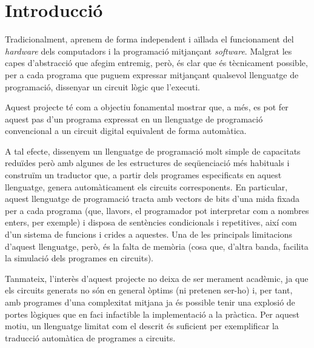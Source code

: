 
\section{Introducció}

Tradicionalment, aprenem de forma independent i aïllada el funcionament del 
\textit{hardware} dels computadors i la programació mitjançant 
\textit{software}. Malgrat les capes d'abstracció que afegim entremig, però, 
és clar que és tècnicament possible, per a cada programa que puguem expressar 
mitjançant qualsevol llenguatge de programació, dissenyar un circuit lògic que 
l'executi.

Aquest projecte té com a objectiu fonamental mostrar que, a més, es pot fer 
aquest pas d'un programa expressat en un llenguatge de programació 
convencional a un circuit digital equivalent de forma automàtica. 

A tal efecte, dissenyem un llenguatge de programació molt simple de capacitats 
reduïdes però amb algunes de les estructures de seqüenciació més habituals i 
construïm un traductor que, a partir dels programes especificats en aquest 
llenguatge, genera automàticament els circuits corresponents. En particular, 
aquest llenguatge de programació tracta amb vectors de bits d'una mida 
fixada per a cada programa (que, llavors, el programador pot interpretar com a 
nombres enters, per exemple) i disposa de sentències condicionals i 
repetitives, així com d'un sistema de funcions i crides a aquestes. Una de 
les principals limitacions d'aquest llenguatge, però, és la falta de memòria 
(cosa que, d'altra banda, facilita la simulació dels programes en circuits). 

Tanmateix, l'interès d'aquest projecte no deixa de ser merament acadèmic, ja 
que els circuits generats no són en general òptims (ni pretenen ser-ho) i, per 
tant, amb programes d'una complexitat mitjana ja és possible tenir una 
explosió de portes lògiques que en faci infactible la implementació a la 
pràctica. Per aquest motiu, un llenguatge limitat com el descrit és suficient 
per exemplificar la traducció automàtica de programes a circuits.

